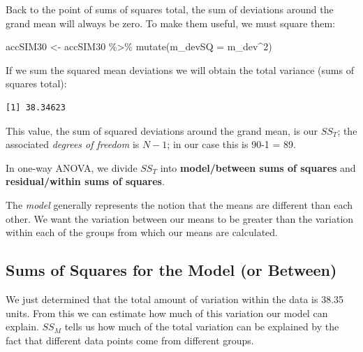 \documentclass[
  english,
]{book}
\newenvironment{Shaded}{\begin{snugshade}}{\end{snugshade}}
\newcommand{\AttributeTok}[1]{\textcolor[rgb]{0.77,0.63,0.00}{#1}}
\newcommand{\DecValTok}[1]{\textcolor[rgb]{0.00,0.00,0.81}{#1}}
\newcommand{\FunctionTok}[1]{\textcolor[rgb]{0.00,0.00,0.00}{#1}}
\newcommand{\NormalTok}[1]{#1}
\newcommand{\OtherTok}[1]{\textcolor[rgb]{0.56,0.35,0.01}{#1}}
\newcommand{\SpecialCharTok}[1]{\textcolor[rgb]{0.00,0.00,0.00}{#1}}
\begin{document}
Back to the point of sums of squares total, the sum of deviations around the grand mean will always be zero. To make them useful, we must square them:

\begin{Shaded}
\begin{Highlighting}[]
\NormalTok{accSIM30 }\OtherTok{\textless{}{-}}\NormalTok{ accSIM30 }\SpecialCharTok{\%\textgreater{}\%} 
  \FunctionTok{mutate}\NormalTok{(}\AttributeTok{m\_devSQ =}\NormalTok{ m\_dev}\SpecialCharTok{\^{}}\DecValTok{2}\NormalTok{)}
\end{Highlighting}
\end{Shaded}

If we sum the squared mean deviations we will obtain the total variance (sums of squares total):

\begin{Shaded}
\end{Shaded}

\begin{verbatim}
[1] 38.34623
\end{verbatim}

This value, the sum of squared deviations around the grand mean, is our \(SS_T\); the associated \emph{degrees of freedom} is \(N - 1\); in our case this is 90-1 = 89.

In one-way ANOVA, we divide \(SS_T\) into \textbf{model/between sums of squares} and \textbf{residual/within sums of squares}.

The \emph{model} generally represents the notion that the means are different than each other. We want the variation between our means to be greater than the variation within each of the groups from which our means are calculated.

\hypertarget{sums-of-squares-for-the-model-or-between}{%
\subsection{Sums of Squares for the Model (or Between)}\label{sums-of-squares-for-the-model-or-between}}

We just determined that the total amount of variation within the data is 38.35 units. From this we can estimate how much of this variation our model can explain. \(SS_M\) tells us how much of the total variation can be explained by the fact that different data points come from different groups.
\end{document}
